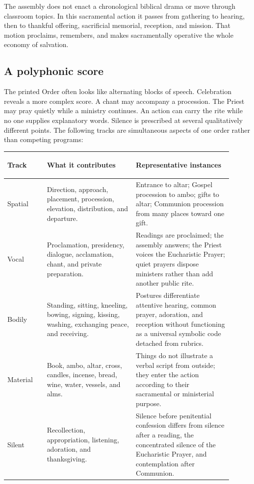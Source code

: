 The assembly does not enact a chronological biblical drama or move through classroom topics. In this sacramental action it passes from gathering to hearing, then to thankful offering, sacrificial memorial, reception, and mission. That motion proclaims, remembers, and makes sacramentally operative the whole economy of salvation.

\subsection{A polyphonic score}

The printed Order often looks like alternating blocks of speech. Celebration reveals a more complex score. A chant may accompany a procession. The Priest may pray quietly while a ministry continues. An action can carry the rite while no one supplies explanatory words. Silence is prescribed at several qualitatively different points. The following tracks are simultaneous aspects of one order rather than competing programs:

\noindent\begin{tabular}{>{\bfseries\raggedright\arraybackslash}p{0.16\linewidth}>{\raggedright\arraybackslash}p{0.36\linewidth}>{\raggedright\arraybackslash}p{0.39\linewidth}}
Track & What it contributes & Representative instances\\
\midrule
Spatial & Direction, approach, placement, procession, elevation, distribution, and departure. & Entrance to altar; Gospel procession to ambo; gifts to altar; Communion procession from many places toward one gift.\\
Vocal & Proclamation, presidency, dialogue, acclamation, chant, and private preparation. & Readings are proclaimed; the assembly answers; the Priest voices the Eucharistic Prayer; quiet prayers dispose ministers rather than add another public rite.\\
Bodily & Standing, sitting, kneeling, bowing, signing, kissing, washing, exchanging peace, and receiving. & Postures differentiate attentive hearing, common prayer, adoration, and reception without functioning as a universal symbolic code detached from rubrics.\\
Material & Book, ambo, altar, cross, candles, incense, bread, wine, water, vessels, and alms. & Things do not illustrate a verbal script from outside; they enter the action according to their sacramental or ministerial purpose.\\
Silent & Recollection, appropriation, listening, adoration, and thanksgiving. & Silence before penitential confession differs from silence after a reading, the concentrated silence of the Eucharistic Prayer, and contemplation after Communion.\\
\end{tabular}

